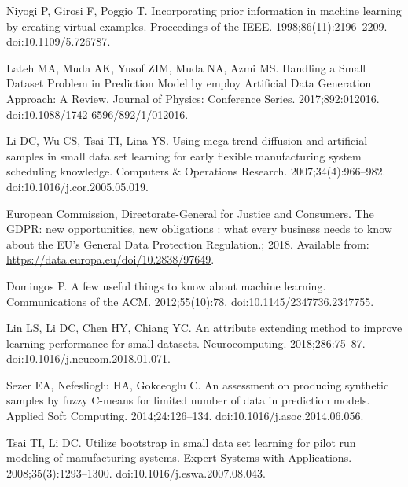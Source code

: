 \documentclass[10pt,letterpaper]{article}
\begin{document}
\begin{thebibliography}{10}

  Niyogi P, Girosi F, Poggio T.
  \newblock Incorporating prior information in machine learning by creating
    virtual examples.
  \newblock Proceedings of the {IEEE}. 1998;86(11):2196--2209.
  \newblock doi:{10.1109/5.726787}.
  
  Lateh MA, Muda AK, Yusof ZIM, Muda NA, Azmi MS.
  \newblock Handling a Small Dataset Problem in Prediction Model by employ
    Artificial Data Generation Approach: A Review.
  \newblock Journal of Physics: Conference Series. 2017;892:012016.
  \newblock doi:{10.1088/1742-6596/892/1/012016}.
  
  Li DC, Wu CS, Tsai TI, Lina YS.
  \newblock Using mega-trend-diffusion and artificial samples in small data set
    learning for early flexible manufacturing system scheduling knowledge.
  \newblock Computers {\&} Operations Research. 2007;34(4):966--982.
  \newblock doi:{10.1016/j.cor.2005.05.019}.
  
  {European Commission}, {Directorate-General for Justice and Consumers}.
  \newblock The {GDPR}: new opportunities, new obligations : what every business
    needs to know about the {EU}’s {General} {Data} {Protection} {Regulation}.;
    2018.
  \newblock Available from: \url{https://data.europa.eu/doi/10.2838/97649}.
  
  Domingos P.
  \newblock A few useful things to know about machine learning.
  \newblock Communications of the {ACM}. 2012;55(10):78.
  \newblock doi:{10.1145/2347736.2347755}.
  
  Lin LS, Li DC, Chen HY, Chiang YC.
  \newblock An attribute extending method to improve learning performance for
    small datasets.
  \newblock Neurocomputing. 2018;286:75--87.
  \newblock doi:{10.1016/j.neucom.2018.01.071}.
  
  Sezer EA, Nefeslioglu HA, Gokceoglu C.
  \newblock An assessment on producing synthetic samples by fuzzy C-means for
    limited number of data in prediction models.
  \newblock Applied Soft Computing. 2014;24:126--134.
  \newblock doi:{10.1016/j.asoc.2014.06.056}.
  
  Tsai TI, Li DC.
  \newblock Utilize bootstrap in small data set learning for pilot run modeling
    of manufacturing systems.
  \newblock Expert Systems with Applications. 2008;35(3):1293--1300.
  \newblock doi:{10.1016/j.eswa.2007.08.043}.
  

\end{thebibliography}
\end{document}
